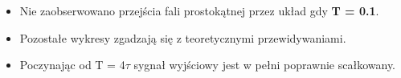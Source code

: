 \begin{itemize}
    \item Nie zaobserwowano przejścia fali prostokątnej przez układ gdy \textbf{T = 0.1}\boldsymbol{\tau}.
    \item Pozostałe wykresy zgadzają się z teoretycznymi przewidywaniami.
    \item Poczynając od \approx T = 4$\tau$ sygnał wyjściowy jest w pełni poprawnie scałkowany.
\end{itemize}
